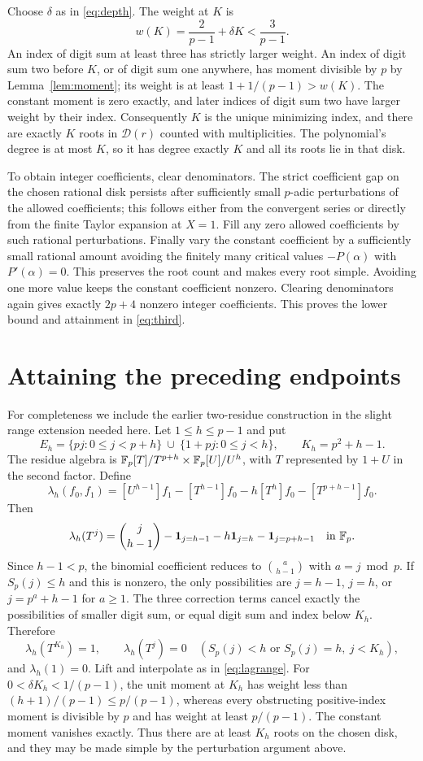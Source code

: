 \documentclass[11pt]{article}
\theoremstyle{remark}\newtheorem{remark}[theorem]{Remark}
\begin{document}
Choose $\delta$ as in \eqref{eq:depth}. The weight at $K$ is
\[
 w(K)=\frac2{p-1}+\delta K<\frac3{p-1}.
\]
An index of digit sum at least three has strictly larger weight. An index of digit sum two before $K$, or of digit sum one anywhere, has moment divisible by $p$ by Lemma~\ref{lem:moment}; its weight is at least $1+1/(p-1)>w(K)$. The constant moment is zero exactly, and later indices of digit sum two have larger weight by their index. Consequently $K$ is the unique minimizing index, and there are exactly $K$ roots in $\mathcal D(r)$ counted with multiplicities. The polynomial's degree is at most $K$, so it has degree exactly $K$ and all its roots lie in that disk.

To obtain integer coefficients, clear denominators. The strict coefficient gap on the chosen rational disk persists after sufficiently small $p$-adic perturbations of the allowed coefficients; this follows either from the convergent series or directly from the finite Taylor expansion at $X=1$. Fill any zero allowed coefficients by such rational perturbations. Finally vary the constant coefficient by a sufficiently small rational amount avoiding the finitely many critical values $-P(\alpha)$ with $P'(\alpha)=0$. This preserves the root count and makes every root simple. Avoiding one more value keeps the constant coefficient nonzero. Clearing denominators again gives exactly $2p+4$ nonzero integer coefficients. This proves the lower bound and attainment in \eqref{eq:third}.

\section{Attaining the preceding endpoints}
For completeness we include the earlier two-residue construction in the slight range extension needed here. Let $1\le h\le p-1$ and put
\[
 E_h=\{pj:0\le j<p+h\}\ \cup\ \{1+pj:0\le j<h\},\qquad K_h=p^2+h-1.
\]
The residue algebra is $\mathbb F_p[T]/T^{p+h}\times\mathbb F_p[U]/U^h$, with $T$ represented by $1+U$ in the second factor. Define
\[
 \lambda_h(f_0,f_1)
 =[U^{h-1}]f_1-[T^{h-1}]f_0-h[T^h]f_0-[T^{p+h-1}]f_0.
\]
Then
\[
 \lambda_h(T^j)=\binom{j}{h-1}-\mathbf1_{j=h-1}-h\mathbf1_{j=h}-\mathbf1_{j=p+h-1}
 \quad\text{in }\mathbb F_p.
\]
Since $h-1<p$, the binomial coefficient reduces to $\binom{a}{h-1}$ with $a=j\bmod p$. If $S_p(j)\le h$ and this is nonzero, the only possibilities are $j=h-1$, $j=h$, or $j=p^a+h-1$ for $a\ge1$. The three correction terms cancel exactly the possibilities of smaller digit sum, or equal digit sum and index below $K_h$. Therefore
\[
 \lambda_h(T^{K_h})=1,\qquad
 \lambda_h(T^j)=0\quad(S_p(j)<h\text{ or }S_p(j)=h,\ j<K_h),
\]
and $\lambda_h(1)=0$. Lift and interpolate as in \eqref{eq:lagrange}. For $0<\delta K_h<1/(p-1)$, the unit moment at $K_h$ has weight less than $(h+1)/(p-1)\le p/(p-1)$, whereas every obstructing positive-index moment is divisible by $p$ and has weight at least $p/(p-1)$. The constant moment vanishes exactly. Thus there are at least $K_h$ roots on the chosen disk, and they may be made simple by the perturbation argument above.
\end{document}
